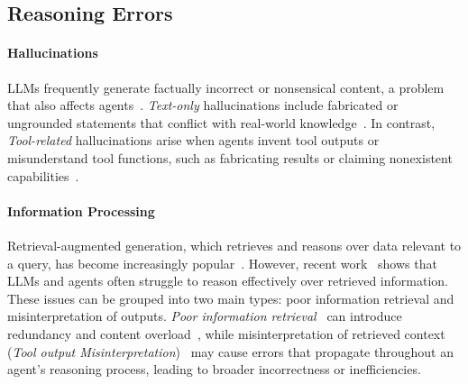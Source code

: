 \documentclass[11pt]{article}
\begin{document}
\subsection{Reasoning Errors}
\paragraph{Hallucinations}
LLMs frequently generate factually incorrect or nonsensical content, a problem that also affects agents~\cite{huang_etal_llm_hallucination_survey, ji_etal_survey_hallucination_nlg}. \textit{Text-only} hallucinations include fabricated or ungrounded statements that conflict with real-world knowledge~\cite{ji_etal_survey_hallucination_nlg}. In contrast, \textit{Tool-related} hallucinations arise when agents invent tool outputs or misunderstand tool functions, such as fabricating results or claiming nonexistent capabilities~\cite{zhang2024toolbehonestmultilevelhallucinationdiagnostic, xu2024reducingtoolhallucination}.

\paragraph{Information Processing}
Retrieval-augmented generation, which retrieves and reasons over data relevant to a query, has become increasingly popular~\cite{hu2024ragrausurveyretrievalaugmented, gao2025synergizingragreasoningsystematic}. However, recent work~\cite{xu2025doescontextmattercontextualjudgebench, su2025brightrealisticchallengingbenchmark} shows that LLMs and agents often struggle to reason effectively over retrieved information. These issues can be grouped into two main types: poor information retrieval and misinterpretation of outputs. \textit{Poor information retrieval}~\cite{wu2024stark} can introduce redundancy and content overload~\cite{stechly2024chain}, while misinterpretation of retrieved context (\textit{Tool output Misinterpretation})~\cite{karpinska2024one, wang-etal-2024-leave} may cause errors that propagate throughout an agent’s reasoning process, leading to broader incorrectness or inefficiencies.
\end{document}
